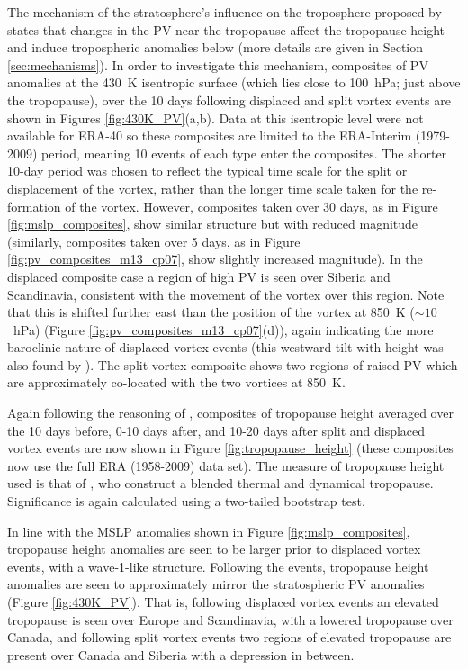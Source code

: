 The mechanism of the stratosphere's influence on the troposphere proposed by
\citet{Ambaum2002} states that changes in the PV near the tropopause affect the
tropopause height and induce tropospheric anomalies below (more details are
given in Section \ref{sec:mechanisms}). In order to investigate this mechanism,
composites of PV anomalies at the 430~K isentropic surface (which lies close to
100~hPa; just above the tropopause), over the 10 days following displaced and
split vortex events are shown in Figures \ref{fig:430K_PV}(a,b). Data at this
isentropic level were not available for ERA-40 so these composites are limited
to the ERA-Interim (1979-2009) period, meaning 10 events of each type enter the
composites. The shorter 10-day period was chosen to reflect the typical time
scale for the split or displacement of the vortex, rather than the longer time
scale taken for the re-formation of the vortex. However, composites taken over
30 days, as in Figure \ref{fig:mslp_composites}, show similar structure but with
reduced magnitude (similarly, composites taken over 5 days, as in Figure
\ref{fig:pv_composites_m13_cp07}, show slightly increased magnitude). In the
displaced composite case a region of high PV is seen over Siberia and
Scandinavia, consistent with the movement of the vortex over this region. Note
that this is shifted further east than the position of the vortex at 850~K
($\sim 10$~hPa) (Figure \ref{fig:pv_composites_m13_cp07}(d)), again indicating
the more baroclinic nature of displaced vortex events (this westward tilt with
height was also found by \citet{Matthewman2009}). The split vortex composite
shows two regions of raised PV which are approximately co-located with the two
vortices at 850~K.

Again following the reasoning of \citet{Ambaum2002}, composites of tropopause
height averaged over the 10 days before, 0-10 days after, and 10-20 days after
split and displaced vortex events are now shown in Figure
\ref{fig:tropopause_height} (these composites now use the full ERA (1958-2009)
data set). The measure of tropopause height used is that of \citet{Wilcox2012a},
who construct a blended thermal and dynamical tropopause. Significance is again
calculated using a two-tailed bootstrap test.

In line with the MSLP anomalies shown in Figure \ref{fig:mslp_composites},
tropopause height anomalies are seen to be larger prior to displaced vortex
events, with a wave-1-like structure. Following the events, tropopause height
anomalies are seen to approximately mirror the stratospheric PV anomalies
(Figure \ref{fig:430K_PV}). That is, following displaced vortex events an
elevated tropopause is seen over Europe and Scandinavia, with a lowered
tropopause over Canada, and following split vortex events two regions of
elevated tropopause are present over Canada and Siberia with a depression in
between.

